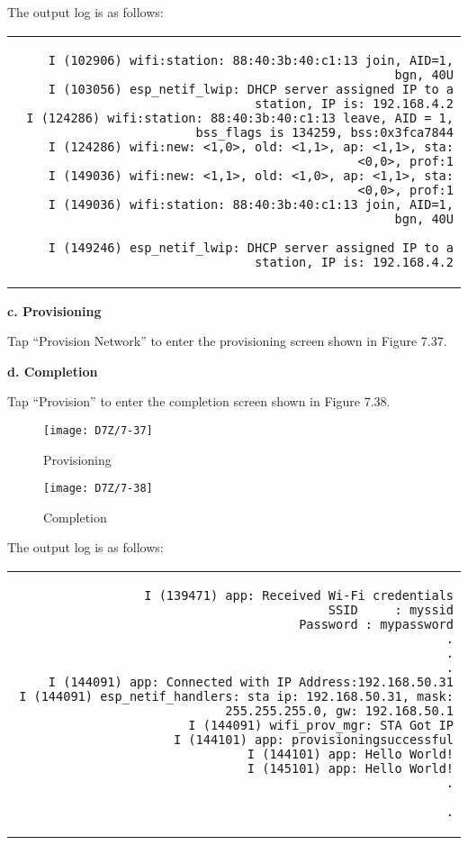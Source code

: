 \documentclass[a4paper,12pt]{book}
\begin{document}
The output log is as follows:

\begin{codebloc}
\fontsize{8pt}{8pt}\selectfont
\begin{tabular}{d}
\vspace{2pt}
\begin{verbatim}
I (102906) wifi:station: 88:40:3b:40:c1:13 join, AID=1, bgn, 40U
I (103056) esp_netif_lwip: DHCP server assigned IP to a station, IP is: 192.168.4.2
I (124286) wifi:station: 88:40:3b:40:c1:13 leave, AID = 1, bss_flags is 134259, bss:0x3fca7844
I (124286) wifi:new: <1,0>, old: <1,1>, ap: <1,1>, sta: <0,0>, prof:1
I (149036) wifi:new: <1,1>, old: <1,0>, ap: <1,1>, sta: <0,0>, prof:1
I (149036) wifi:station: 88:40:3b:40:c1:13 join, AID=1, bgn, 40U
\end{verbatim}
\verb|I (149246) esp_netif_lwip: DHCP server assigned IP to a station, IP is: 192.168.4.2|
\end{tabular}
\end{codebloc}

\textbf{c. Provisioning}

Tap “Provision Network” to enter the provisioning screen shown in Figure 7.37.

\textbf{d. Completion}

Tap “Provision” to enter the completion screen shown in Figure 7.38.

\begin{figure}[!h]
  \Centering
  \begin{minipage}[b]{0.4\textwidth}
    \texttt{[image: D7Z/7-37]}
    \caption{Provisioning}
  \end{minipage}\hspace{1em}
  \begin{minipage}[b]{0.4\textwidth}
    \texttt{[image: D7Z/7-38]}
    \caption{Completion}
  \end{minipage}
\end{figure}

The output log is as follows:

\begin{codebloc}
\fontsize{8pt}{8pt}\selectfont
\begin{tabular}{d}
\vspace{2pt}
\begin{verbatim}
I (139471) app: Received Wi-Fi credentials
          SSID     : myssid
          Password : mypassword
          .
          .
          .
I (144091) app: Connected with IP Address:192.168.50.31
I (144091) esp_netif_handlers: sta ip: 192.168.50.31, mask: 255.255.255.0, gw: 192.168.50.1
I (144091) wifi_prov_mgr: STA Got IP
I (144101) app: provisioningsuccessful
I (144101) app: Hello World!
I (145101) app: Hello World!
          .
\end{verbatim}
\verb|          .|
\end{tabular}
\end{codebloc}
\end{document}
